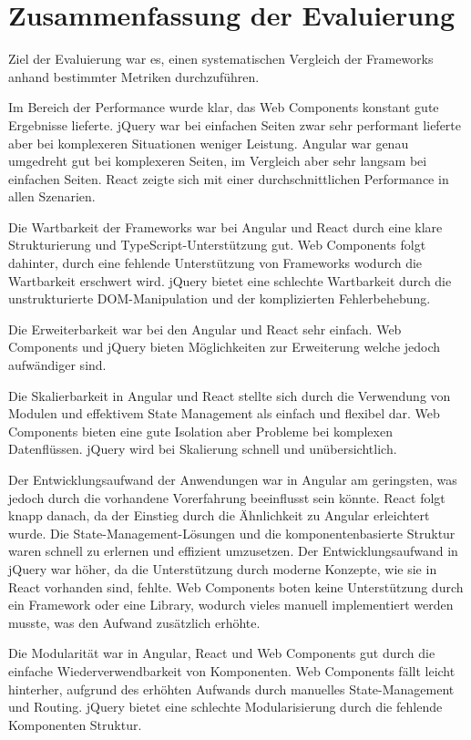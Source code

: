 \documentclass[oneside]{ausarbeitung}
\begin{document}
\section{Zusammenfassung der Evaluierung}
\label{sec:Zusammenfassung_der_Evaluierung}

Ziel der Evaluierung war es, einen systematischen Vergleich der Frameworks anhand bestimmter Metriken durchzuführen. 

Im Bereich der Performance wurde klar, das Web Components konstant gute Ergebnisse lieferte. jQuery war bei einfachen Seiten zwar sehr performant lieferte aber bei komplexeren Situationen weniger Leistung. Angular war genau umgedreht gut bei komplexeren Seiten, im Vergleich aber sehr langsam bei einfachen Seiten. React zeigte sich mit einer durchschnittlichen Performance in allen Szenarien.

Die Wartbarkeit der Frameworks war bei Angular und React durch eine klare Strukturierung und TypeScript-Unterstützung gut. Web Components folgt dahinter, durch eine fehlende Unterstützung von Frameworks wodurch die  Wartbarkeit erschwert wird. jQuery bietet eine schlechte Wartbarkeit durch die unstrukturierte DOM-Manipulation und der komplizierten Fehlerbehebung. 

Die Erweiterbarkeit war bei den Angular und React sehr einfach. Web Components und jQuery bieten Möglichkeiten zur Erweiterung welche jedoch aufwändiger sind.

Die Skalierbarkeit in Angular und React stellte sich durch die Verwendung von Modulen und effektivem State Management als einfach und flexibel dar. Web Components bieten eine gute Isolation aber Probleme bei komplexen Datenflüssen. jQuery wird bei Skalierung schnell und unübersichtlich.

Der Entwicklungsaufwand der Anwendungen war in Angular am geringsten, was jedoch durch die vorhandene Vorerfahrung beeinflusst sein könnte. React folgt knapp danach, da der Einstieg durch die Ähnlichkeit zu Angular erleichtert wurde. Die State-Management-Lösungen und die komponentenbasierte Struktur waren schnell zu erlernen und effizient umzusetzen. Der Entwicklungsaufwand in jQuery war höher, da die Unterstützung durch moderne Konzepte, wie sie in React vorhanden sind, fehlte. Web Components boten keine Unterstützung durch ein Framework oder eine Library, wodurch vieles manuell implementiert werden musste, was den Aufwand zusätzlich erhöhte.

Die Modularität war in Angular, React und Web Components gut durch die einfache Wiederverwendbarkeit von Komponenten. Web Components fällt leicht hinterher, aufgrund des erhöhten Aufwands durch manuelles State-Management und Routing. jQuery bietet eine schlechte Modularisierung durch die fehlende Komponenten Struktur.
\end{document}
